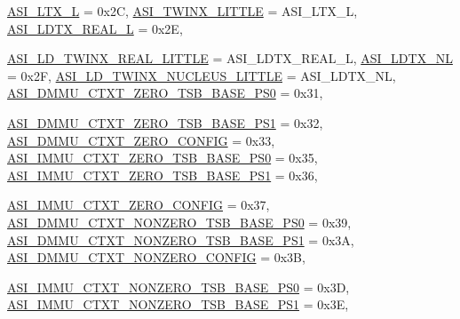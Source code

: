 \begin{DoxyCompactItemize}
\hyperlink{namespaceSparcISA_a6dd43f1311515252b283f56d7095a1f3a2fc3fc03e421f78e27954a56fa5b199e}{ASI\_\-LTX\_\-L} =  0x2C, 
\hyperlink{namespaceSparcISA_a6dd43f1311515252b283f56d7095a1f3a8f054dd427581a9c4a0cb2ae72fa75ec}{ASI\_\-TWINX\_\-LITTLE} =  ASI\_\-LTX\_\-L, 
\hyperlink{namespaceSparcISA_a6dd43f1311515252b283f56d7095a1f3a7c8c541db440a125c1e2d40b6d81b0a8}{ASI\_\-LDTX\_\-REAL\_\-L} =  0x2E, 
\par
\hyperlink{namespaceSparcISA_a6dd43f1311515252b283f56d7095a1f3a536978db6c80690e4e6df60f2ba605d1}{ASI\_\-LD\_\-TWINX\_\-REAL\_\-LITTLE} =  ASI\_\-LDTX\_\-REAL\_\-L, 
\hyperlink{namespaceSparcISA_a6dd43f1311515252b283f56d7095a1f3a3c7d34ee470568a374f7ba49e7c36c46}{ASI\_\-LDTX\_\-NL} =  0x2F, 
\hyperlink{namespaceSparcISA_a6dd43f1311515252b283f56d7095a1f3a44639cfeec9ee07146e0e0d14c30c1b4}{ASI\_\-LD\_\-TWINX\_\-NUCLEUS\_\-LITTLE} =  ASI\_\-LDTX\_\-NL, 
\hyperlink{namespaceSparcISA_a6dd43f1311515252b283f56d7095a1f3a79d80f1dc735b1bf94db306867765cf0}{ASI\_\-DMMU\_\-CTXT\_\-ZERO\_\-TSB\_\-BASE\_\-PS0} =  0x31, 
\par
\hyperlink{namespaceSparcISA_a6dd43f1311515252b283f56d7095a1f3a02ffd985f08d0f930403e9e3183997de}{ASI\_\-DMMU\_\-CTXT\_\-ZERO\_\-TSB\_\-BASE\_\-PS1} =  0x32, 
\hyperlink{namespaceSparcISA_a6dd43f1311515252b283f56d7095a1f3a9127fbcda67c82b315d3a91fc245a42e}{ASI\_\-DMMU\_\-CTXT\_\-ZERO\_\-CONFIG} =  0x33, 
\hyperlink{namespaceSparcISA_a6dd43f1311515252b283f56d7095a1f3ad6d094185ca66a67ce2d96a07b27b9df}{ASI\_\-IMMU\_\-CTXT\_\-ZERO\_\-TSB\_\-BASE\_\-PS0} =  0x35, 
\hyperlink{namespaceSparcISA_a6dd43f1311515252b283f56d7095a1f3aed27b34cf4c8494150a1159c04139356}{ASI\_\-IMMU\_\-CTXT\_\-ZERO\_\-TSB\_\-BASE\_\-PS1} =  0x36, 
\par
\hyperlink{namespaceSparcISA_a6dd43f1311515252b283f56d7095a1f3ad4cee8abff015247865fd75aff81dd5b}{ASI\_\-IMMU\_\-CTXT\_\-ZERO\_\-CONFIG} =  0x37, 
\hyperlink{namespaceSparcISA_a6dd43f1311515252b283f56d7095a1f3a3a09de027e5e8d32fe1d8f036f44038a}{ASI\_\-DMMU\_\-CTXT\_\-NONZERO\_\-TSB\_\-BASE\_\-PS0} =  0x39, 
\hyperlink{namespaceSparcISA_a6dd43f1311515252b283f56d7095a1f3ae485b3d0dcadda627264a2b94293d0dd}{ASI\_\-DMMU\_\-CTXT\_\-NONZERO\_\-TSB\_\-BASE\_\-PS1} =  0x3A, 
\hyperlink{namespaceSparcISA_a6dd43f1311515252b283f56d7095a1f3a9e6fd0719e3846fca804369478bf8d69}{ASI\_\-DMMU\_\-CTXT\_\-NONZERO\_\-CONFIG} =  0x3B, 
\par
\hyperlink{namespaceSparcISA_a6dd43f1311515252b283f56d7095a1f3aeeb6893031be8b60b1c4d695e9afd72e}{ASI\_\-IMMU\_\-CTXT\_\-NONZERO\_\-TSB\_\-BASE\_\-PS0} =  0x3D, 
\hyperlink{namespaceSparcISA_a6dd43f1311515252b283f56d7095a1f3a058db0e724aefaf2ebf5e6d8ee7089aa}{ASI\_\-IMMU\_\-CTXT\_\-NONZERO\_\-TSB\_\-BASE\_\-PS1} =  0x3E, 

\end{DoxyCompactItemize}
